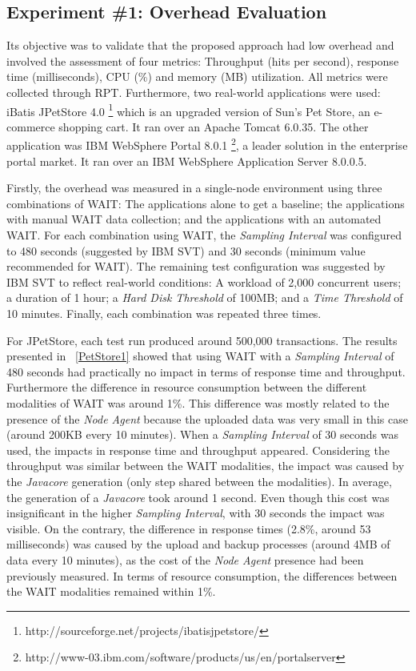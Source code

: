 \documentclass[runningheads,a4paper]{llncs}
\begin{document}
\vspace{-7pt}
\subsection{Experiment \#1: Overhead Evaluation}
\vspace{-7pt}

Its objective was to validate that the proposed approach had low overhead and
involved the assessment of four metrics: Throughput (hits per second), response
time (milliseconds), CPU (\%) and memory (MB) utilization. All metrics were
collected through RPT. Furthermore, two real-world applications were used:
iBatis JPetStore 4.0 \footnote{http://sourceforge.net/projects/ibatisjpetstore/}
which is an upgraded version of Sun's Pet Store, an e-commerce shopping cart. It
ran over an Apache Tomcat 6.0.35. 
The other application was IBM WebSphere Portal 
8.0.1 \footnote{http://www-03.ibm.com/software/products/us/en/portalserver},
a leader solution in the enterprise portal market.  
\cite{Gartner2008}
It ran over an IBM WebSphere Application Server 8.0.0.5.

Firstly, the overhead was measured in a single-node environment using three
combinations of WAIT: The applications alone to get a baseline; the applications
with manual WAIT data collection; and the applications with an automated WAIT.
For each combination using WAIT, the \emph{Sampling Interval} was configured
to 480 seconds (suggested by IBM SVT) and 30 seconds (minimum value recommended for
WAIT). The remaining test configuration was suggested by IBM SVT to
reflect real-world conditions: A workload of 2,000 concurrent users; a duration
of 1 hour; a \emph{Hard Disk Threshold} of 100MB; and a \emph{Time Threshold} of
10 minutes. Finally, each combination was repeated three times.

For JPetStore, each test run produced around 500,000 transactions. The results
presented in \tablename ~\ref{PetStore1} showed that using WAIT with a
\emph{Sampling Interval} of 480 seconds had practically no impact in terms of
response time and throughput. Furthermore the difference in resource consumption
between the different modalities of WAIT was around 1\%.  This difference was
mostly related to the presence of the \emph{Node Agent} because the uploaded
data was very small in this case (around 200KB every 10 minutes). When a
\emph{Sampling Interval} of 30 seconds was used, the impacts in response time
and throughput appeared. Considering the throughput was similar between the WAIT
modalities, the impact was caused by the \emph{Javacore} generation (only step
shared between the modalities). In average, the generation of a \emph{Javacore}
took around 1 second. Even though this cost was insignificant in the higher
\emph{Sampling Interval}, with 30 seconds the impact was visible. On the
contrary, the difference in response times (2.8\%, around 53 milliseconds) was
caused by the upload and backup processes (around 4MB of data every 10 minutes),
as the cost of the \emph{Node Agent} presence had been previously measured. In
terms of resource consumption, the differences between the WAIT modalities
remained within 1\%.
\end{document}
